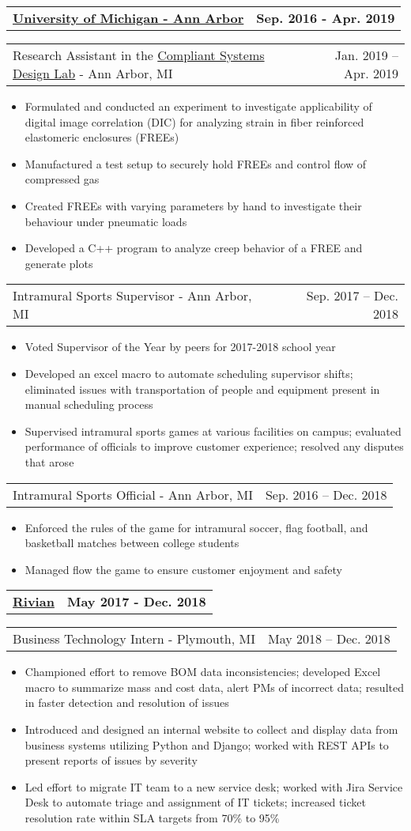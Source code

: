 \documentclass[letterpaper,11pt]{article}
\makeatletter
\newcommand{\resumeItem}[1]{
	\item\small{
		#1
	}
}
\newcommand{\resumeCompanyHeading}[2]{
  \vspace{-1pt}\item
    \begin{tabular*}{0.97\textwidth}[t]{l@{\extracolsep{\fill}}r}
      \textbf{#1} & \textbf{#2} \\
    \end{tabular*}\vspace{-0pt}
}
\newcommand{\resumeJobHeading}[3]{
	\vspace{-1pt}
	\begin{tabular*}{0.97\textwidth}[t]{l@{\extracolsep{\fill}}r}
		{\small#1} - {\small #2} & {\small #3} \\
	\end{tabular*}\vspace{-4pt}
}
\newcommand{\resumeItemListStart}{\begin{itemize}}
\newcommand{\resumeItemListEnd}{\end{itemize}\vspace{-4pt}}
\makeatother
\begin{document}
\resumeCompanyHeading{\href{https://umich.edu/}{University of Michigan - Ann Arbor}}{Sep. 2016 - Apr. 2019}
\resumeJobHeading{Research Assistant in the \href{http://csdl.engin.umich.edu/}{Compliant Systems Design Lab}}{Ann Arbor, MI}{Jan. 2019 -- Apr. 2019}
\resumeItemListStart
\resumeItem{Formulated and conducted an experiment to investigate applicability of digital image correlation (DIC) for analyzing strain in fiber reinforced elastomeric enclosures (FREEs)}
\resumeItem{Manufactured a test setup to securely hold FREEs and control flow of compressed gas}
\resumeItem{Created FREEs with varying parameters by hand to investigate their behaviour under pneumatic loads}
\resumeItem{Developed a C++ program to analyze creep behavior of a FREE and generate plots}
\resumeItemListEnd

\resumeJobHeading{Intramural Sports Supervisor}{Ann Arbor, MI}{Sep. 2017 -- Dec. 2018}
\resumeItemListStart
\resumeItem{Voted Supervisor of the Year by peers for 2017-2018 school year}
\resumeItem{Developed an excel macro to automate scheduling supervisor shifts; eliminated issues with transportation of people and equipment present in manual scheduling process}
\resumeItem{Supervised intramural sports games at various facilities on campus; evaluated performance of officials to improve customer experience; resolved any disputes that arose}
\resumeItemListEnd

\resumeJobHeading{Intramural Sports Official}{Ann Arbor, MI}{Sep. 2016 -- Dec. 2018}
\resumeItemListStart
\resumeItem{Enforced the rules of the game for intramural soccer, flag football, and basketball matches between college students}
\resumeItem{Managed flow the game to ensure customer enjoyment and safety}
\resumeItemListEnd

\resumeCompanyHeading{\href{https://rivian.com/}{Rivian}}{May 2017 - Dec. 2018}
\resumeJobHeading{Business Technology Intern}{Plymouth, MI}{May 2018 -- Dec. 2018}
\resumeItemListStart
\resumeItem{Championed effort to remove BOM data inconsistencies; developed Excel macro to summarize mass and cost data, alert PMs of incorrect data; resulted in faster detection and resolution of issues}
\resumeItem{Introduced and designed an internal website to collect and display data from business systems utilizing Python and Django; worked with REST APIs to present reports of issues by severity}
\resumeItem{Led effort to migrate IT team to a new service desk; worked with Jira Service Desk to automate triage and assignment of IT tickets; increased ticket resolution rate within SLA targets from 70\% to 95\%}
\resumeItemListEnd
\end{document}
